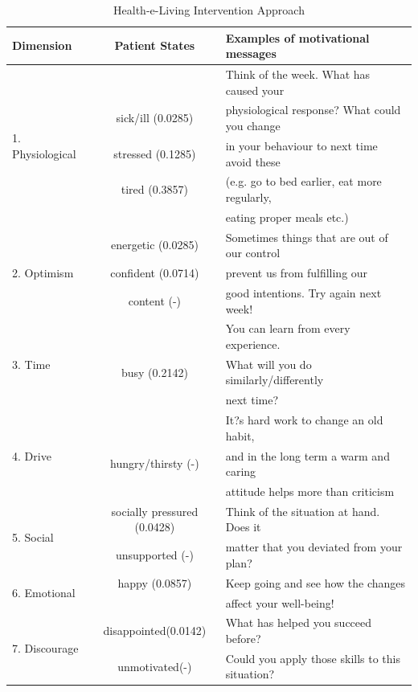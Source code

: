 \documentclass[graybox]{svmult}
\begin{document}
\begin{table}[h]
\caption{ Health-e-Living Intervention Approach}
\begin{tabular}{ | l | c | l |}
\hline
Dimension & Patient States & Examples of motivational messages\\ \hline
\multirow{5}{*}{1. Physiological} &  & Think of the week. What has caused your  \\
 & sick/ill  (0.0285)  & physiological response? What could you change  \\
 & stressed (0.1285)  & in your behaviour to next time avoid these \\ 
&    tired (0.3857)  & (e.g. go to bed earlier, eat more regularly, \\ 
&   & eating proper meals etc.)  \\ \hline
\multirow{3}{*}{2. Optimism} & energetic (0.0285) & Sometimes things that are out of our control  \\
 &   confident  (0.0714)  & prevent us from fulfilling our\\
 &  content (-) &  good intentions. Try again next week!\\ \hline
\multirow{3}{*}{3. Time } &  & You can learn from every experience. \\ 
&  busy (0.2142)   &What will you do similarly/differently\\
&  &  next time? \\ \hline
\multirow{3}{*}{4. Drive} &  & It?s hard work to change an old habit, \\
& hungry/thirsty (-) & and in the long term a warm and caring \\
& &  attitude helps more than criticism\\ \hline
\multirow{2}{*}{5. Social } &  socially pressured (0.0428) & Think of the situation at hand. Does it  \\
 &  unsupported (-) & matter that you deviated from your plan? \\ \hline
\multirow{2}{*}{6. Emotional } & happy (0.0857)  & Keep going and see how the changes \\ 
& & affect your well-being!\\ \hline
\multirow{2}{*}{7. Discourage } &  disappointed(0.0142) & What has helped you succeed before? \\
 &  unmotivated(-)  & Could you apply those skills to this situation?\\ \hline
\hline
\end{tabular}
\label{Tab.States}
\end{table}
\end{document}

